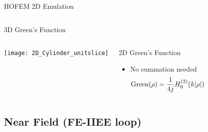 \begin{frame}[allowframebreaks]{HOFEM 2D Emulation}
\begin{columns}
\begin{block}{3D Green's Function}
    \end{block}
  \end{columns}

  \framebreak %

  \begin{columns}
     \centering
    {\texttt{[image: 2D\_Cylinder\_unitslice]}}
    
     \centering
    \begin{block}{2D Green's Function}
      \begin{itemize}
      \item No summation needed
        \begin{equation*}
          \text{Green}(\rho) = \dfrac{1}{4j}  H_0^{(2)}(k|\rho|)
        \end{equation*}
      \end{itemize}
    \end{block}
  \end{columns}

  
 \end{frame}
  

\subsection{Near Field (FE-IIEE loop)}



